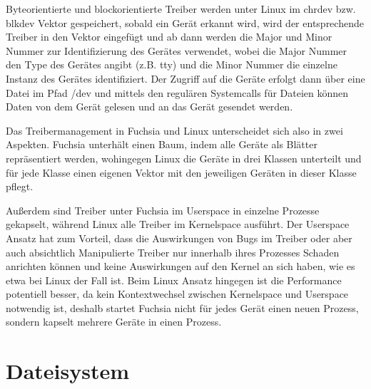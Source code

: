 \documentclass[a4paper]{scrartcl}
\begin{document}
Byteorientierte und blockorientierte Treiber werden unter Linux im chrdev bzw. blkdev Vektor gespeichert, sobald ein Gerät erkannt wird, wird der entsprechende Treiber in den Vektor eingefügt und ab dann werden die Major und Minor Nummer zur Identifizierung des Gerätes verwendet, wobei die Major Nummer den Type des Gerätes angibt (z.B. tty) und die Minor Nummer die einzelne Instanz des Gerätes identifiziert. Der Zugriff auf die Geräte erfolgt dann über eine Datei im Pfad /dev und mittels den regulären Systemcalls für Dateien können Daten von dem Gerät gelesen und an das Gerät gesendet werden.

Das Treibermanagement in Fuchsia und Linux unterscheidet sich also in zwei Aspekten. Fuchsia unterhält einen Baum, indem alle Geräte als Blätter repräsentiert werden, wohingegen Linux die Geräte in drei Klassen unterteilt und für jede Klasse einen eigenen Vektor mit den jeweiligen Geräten in dieser Klasse pflegt.

Außerdem sind Treiber unter Fuchsia im Userspace in einzelne Prozesse gekapselt, während Linux alle Treiber im Kernelspace ausführt. Der Userspace Ansatz hat zum Vorteil, dass die Auswirkungen von Bugs im Treiber oder aber auch absichtlich Manipulierte Treiber nur innerhalb ihres Prozesses Schaden anrichten können und keine Auswirkungen auf den Kernel an sich haben, wie es etwa bei Linux der Fall ist. Beim Linux Ansatz hingegen ist die Performance potentiell besser, da kein Kontextwechsel zwischen Kernelspace und Userspace notwendig ist, deshalb startet Fuchsia nicht für jedes Gerät einen neuen Prozess, sondern kapselt mehrere Geräte in einen Prozess.

\section{Dateisystem}
\label{sec:Dateisystem}
\end{document}
